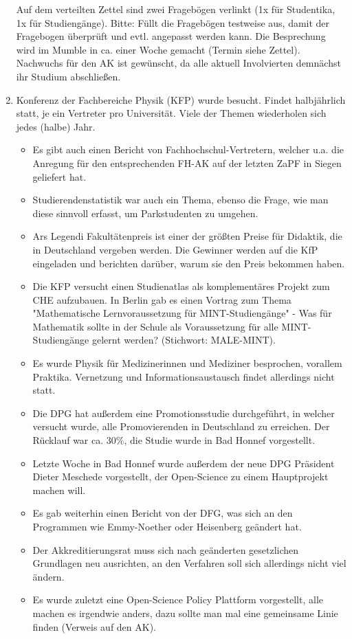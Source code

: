 \begin{enumerate}
      Auf dem verteilten Zettel sind zwei Fragebögen verlinkt (1x für Studentika, 1x für Studiengänge). Bitte: Füllt die Fragebögen testweise aus, damit der Fragebogen überprüft und evtl. angepasst werden kann.
      Die Besprechung wird im Mumble in ca. einer Woche gemacht (Termin siehe Zettel). Nachwuchs für den AK ist gewünscht, da alle aktuell Involvierten demnächst ihr Studium abschließen.
    \item Konferenz der Fachbereiche Physik (KFP) wurde besucht. Findet halbjährlich statt, je ein Vertreter pro Universität. Viele der Themen wiederholen sich jedes (halbe) Jahr.
      \begin{itemize}
        \item Es gibt auch einen Bericht von Fachhochschul-Vertretern, welcher u.a. die Anregung für den entsprechenden FH-AK auf der letzten ZaPF in Siegen geliefert hat.
        \item Studierendenstatistik war auch ein Thema, ebenso die Frage, wie man diese sinnvoll erfasst, um Parkstudenten zu umgehen.
        \item Ars Legendi Fakultätenpreis ist einer der größten Preise für Didaktik, die in Deutschland vergeben werden. Die Gewinner werden auf die KfP eingeladen und berichten darüber, warum sie den Preis bekommen haben.
        \item Die KFP versucht einen Studienatlas als komplementäres Projekt zum CHE aufzubauen. In Berlin gab es einen Vortrag zum Thema "Mathematische Lernvoraussetzung für MINT-Studiengänge" -  Was für Mathematik sollte in der Schule als Voraussetzung für alle MINT-Studiengänge gelernt werden? (Stichwort: MALE-MINT).
        \item Es wurde Physik für Medizinerinnen und Mediziner besprochen, vorallem Praktika. Vernetzung und Informationsaustausch findet allerdings nicht statt.
        \item Die DPG hat außerdem eine Promotionsstudie durchgeführt, in welcher versucht wurde, alle Promovierenden in Deutschland zu erreichen. Der Rücklauf war ca. 30\%, die Studie wurde in Bad Honnef vorgestellt.
        \item Letzte Woche in Bad Honnef wurde außerdem der neue DPG Präsident Dieter Meschede vorgestellt, der Open-Science zu einem Hauptprojekt machen will.
        \item Es gab weiterhin einen Bericht von der DFG, was sich an den Programmen wie Emmy-Noether oder Heisenberg geändert hat.
        \item Der Akkreditierungsrat muss sich nach geänderten gesetzlichen Grundlagen neu ausrichten, an den Verfahren soll sich allerdings nicht viel ändern.
        \item Es wurde zuletzt eine Open-Science Policy Plattform vorgestellt, alle machen es irgendwie anders, dazu sollte man mal eine gemeinsame Linie finden (Verweis auf den AK).
      \end{itemize}
  \end{enumerate}


